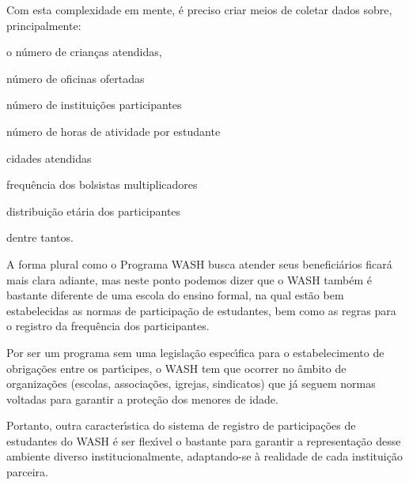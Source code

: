 \documentclass[
12pt,		%
openright,	%
twoside,  %
a4paper,			%
chapter=TITLE,		%
english,			%
french,				%
spanish,			%
brazil				%
]{USPSC-classe/USPSC}
\begin{document}
Com esta complexidade em mente, \'e preciso criar meios de coletar dados sobre, principalmente:











\begin{alineas}
\item o n\'umero de crian\c{c}as atendidas,
\item n\'umero de oficinas ofertadas
\item n\'umero de institui\c{c}\~oes participantes
\item n\'umero de horas de atividade por estudante
\item cidades atendidas
\item frequ\^encia dos bolsistas multiplicadores
\item distribui\c{c}\~ao et\'aria dos participantes
\end{alineas}

dentre tantos.










A forma plural como o Programa WASH busca atender seus benefici\'arios ficar\'a mais clara adiante, mas neste ponto podemos dizer que o WASH tamb\'em \'e bastante diferente de uma escola do ensino formal, na qual est\~ao bem estabelecidas as normas de participa\c{c}\~ao de estudantes, bem como as regras para o registro da frequ\^encia dos participantes.










Por ser um programa sem uma legisla\c{c}\~ao espec\'{\i}fica para o estabelecimento de obriga\c{c}\~oes entre os part\'{\i}cipes, o WASH tem que ocorrer no \^ambito de organiza\c{c}\~oes (escolas, associa\c{c}\~oes, igrejas, sindicatos) que j\'a seguem normas voltadas para garantir a prote\c{c}\~ao dos menores de idade.










Portanto, outra caracter\'{\i}stica do sistema de registro de participa\c{c}\~oes de estudantes do WASH \'e ser flex\'{\i}vel o bastante para garantir a representa\c{c}\~ao desse ambiente diverso institucionalmente, adaptando-se \`a realidade de cada institui\c{c}\~ao parceira.
\end{document}
